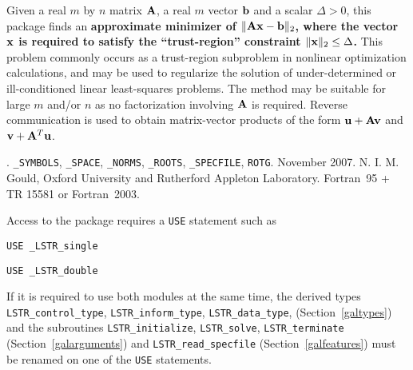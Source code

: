 \documentclass{galahad}
\newcommand{\packagename}{LS\-TR}
\newcommand{\fullpackagename}{\libraryname\_\packagename}
\begin{document}
\galheader


\galsummary
Given a real $m$ by $n$ matrix ${\mathbf{A}}$, a real
$m$ vector ${\mathbf{b}}$ and a scalar $\Delta>0$, this package finds an
{\bf approximate minimizer of $\| {\mathbf{A}} {\mathbf{x}} - {\mathbf{b}}\|_2$, where the vector
${\mathbf{x}}$ is required to satisfy the ``trust-region''
constraint $\|{\mathbf{x}}\|_2 \leq  \Delta$.}
This problem commonly occurs as a trust-region subproblem in nonlinear
optimization calculations, and may be used to regularize the solution
of under-determined or ill-conditioned linear least-squares problems.
The method may be suitable for large $m$ and/or $n$ as no factorization
involving ${\mathbf{A}}$ is required. Reverse communication is used to obtain
matrix-vector products of the form ${\mathbf{u}} + {\mathbf{A}} {\mathbf{v}}$ and
${\mathbf{v}} + {\mathbf{A}}^T {\mathbf{u}}$.


\galattributes
\galversions{\tt  \fullpackagename\_single, \fullpackagename\_double}.
\galuses
{\tt \libraryname\_SY\-M\-BOLS},
{\tt \libraryname\_SPACE}, {\tt \libraryname\_\-NORMS},
{\tt \libraryname\_ROOTS}, {\tt \libraryname\_SPECFILE},
{\tt *ROTG}.
\galdate November 2007.
\galorigin N. I. M. Gould, Oxford University and Rutherford Appleton Laboratory.
\gallanguage Fortran~95 + TR 15581 or Fortran~2003.


\galhowto

Access to the package requires a {\tt USE} statement such as

\medskip{}

\hskip0.5in {\tt USE \fullpackagename\_single}

\medskip{}

\hskip0.5in {\tt USE  \fullpackagename\_double}

\medskip

\noindent
If it is required to use both modules at the same time, the derived types
{\tt \packagename\_control\_type}, {\tt \packagename\_inform\_type},
{\tt \packagename\_data\_type},
(Section~\ref{galtypes})
and the subroutines
{\tt \packagename\_initialize},
{\tt \packagename\_solve}, {\tt \packagename\_terminate}
(Section~\ref{galarguments})
and
{\tt \packagename\_read\_specfile}
(Section~\ref{galfeatures})
must be renamed on one of the {\tt USE} statements.
\end{document}
